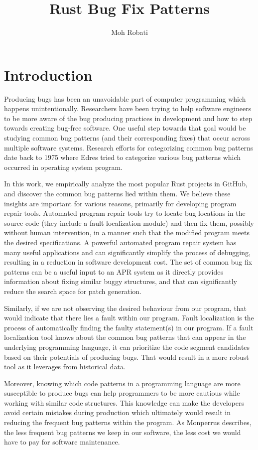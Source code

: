 \documentclass{article}
\title{Rust Bug Fix Patterns}
\author{Moh Robati}
\begin{document}
\maketitle

\section{Introduction}

Producing bugs has been an unavoidable part of computer programming which happens unintentionally. Researchers have been trying to help software engineers to be more aware of the bug producing practices in development and how to step towards creating bug-free software. One useful step towards that goal would be studying common bug patterns (and their corresponding fixes) that occur across multiple software systems. Research efforts for categorizing common bug patterns date back to 1975 where Edres tried to categorize various bug patterns which occurred in operating system program. 

In this work, we empirically analyze the most popular Rust projects in GitHub, and discover the common bug patterns lied within them. We believe these insights are important for various reasons, primarily for developing program repair tools. Automated program repair tools try to locate bug
locations in the source code (they include a fault localization module) and then fix them, possibly without human intervention, in a manner such that the modified program meets the desired specifications. A powerful automated program repair system has many useful applications and can significantly simplify the process of debugging, resulting in a reduction in software development cost. The set of common bug fix patterns can be a useful input to an APR system as it directly provides information about fixing similar buggy structures, and that can significantly reduce the search space for patch generation. 

Similarly, if we are not observing the desired behaviour from our program, that would indicate that there lies a fault within our program. Fault localization is the process of automatically finding the faulty statement(s) in our program. If a fault localization tool knows about the common bug patterns that can appear in the underlying programming language, it can prioritize the code segment candidates based on their potentials of producing bugs. That would result in a more robust tool as it leverages from historical data.

Moreover, knowing which code patterns in a programming language are more susceptible to produce bugs can help programmers to be more cautious while working with similar code structures. This knowledge can make the developers avoid certain mistakes during production which ultimately would result in reducing the frequent bug patterns within the program. As Monperrus describes, the less frequent bug patterns we keep in our software, the less cost we would have to pay for software maintenance.
\end{document}
